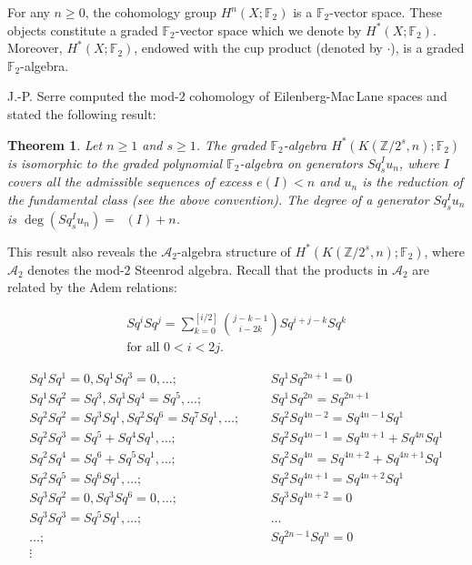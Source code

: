 \documentclass{amsart}
\newtheorem*{thm*}{Theorem}
\theoremstyle{definition}
\theoremstyle{remark}
\DeclareMathOperator{\degst}{deg_{st}}
\newcommand{\Z}{\mathbb{Z}}
\newcommand{\F}{\mathbb{F}}
\newcommand{\A}{\mathcal{A}}
\renewcommand{\geq}{\geqslant}
\begin{document}
For any $n\geq0$, the cohomology group $H^n(X;\F_2)$ is a $\F_2$-vector space. These objects constitute a graded $\F_2$-vector space which we denote by $H^*(X;\F_2)$. Moreover, $H^*(X;\F_2)$, endowed with the cup product (denoted by $\cdot$), is a graded $\F_2$-algebra.

\medskip
\newpage
J.-P. Serre \cite{Se53} computed the mod-$2$ cohomology of Eilenberg-Mac\,Lane spaces and stated the following result:


\begin{thm*}
Let $n\geq1$ and $s\geq1$. The graded $\F_2$-algebra $H^*(K(\Z/2^s,n);\F_2)$ is isomorphic to the graded polynomial $\F_2$-algebra on generators $Sq^I_s u_n$, where $I$ covers all the admissible sequences of excess $e(I)<n$ and $u_n$ is the reduction of the fundamental class (see the above convention). The degree of a generator $Sq^I_s u_n$ is $\deg(Sq^I_s u_n)=\degst(I)+n$. 
\end{thm*}


This result also reveals the $\A_2$-algebra structure of $H^*(K(\Z/2^s,n);\F_2)$, where $\A_2$ denotes the mod-$2$ Steenrod algebra. Recall that the products in $\A_2$ are related by the Adem relations:

\begin{align*}
Sq^iSq^j=\sum_{k=0}^{[i/2]}\binom{j-k-1}{i-2k}Sq^{i+j-k}Sq^k\\
\text{for all $0<i<2j$.}
\end{align*}

\begin{align*}
Sq^1Sq^1=0, Sq^1Sq^3=0,\dots; &&&Sq^1Sq^{2n+1}=0\\
Sq^1Sq^2=Sq^3,Sq^1Sq^4=Sq^5,\dots; &&&Sq^1Sq^{2n}=Sq^{2n+1}\\
Sq^2Sq^2=Sq^3Sq^1, Sq^2Sq^6=Sq^7Sq^1,\dots; &&&Sq^2Sq^{4n-2}=Sq^{4n-1}Sq^1\\
Sq^2Sq^3=Sq^5+Sq^4Sq^1,\dots; &&&Sq^2Sq^{4n-1}=Sq^{4n+1}+Sq^{4n}Sq^1\\
Sq^2Sq^4=Sq^6+Sq^5Sq^1,\dots; &&&Sq^{2}Sq^{4n}=Sq^{4n+2}+Sq^{4n+1}Sq^1\\
Sq^2Sq^5=Sq^6Sq^1,\dots; &&&Sq^2Sq^{4n+1}=Sq^{4n+2}Sq^1\\
Sq^3Sq^2=0, Sq^3Sq^6=0,\dots; &&&Sq^3Sq^{4n+2}=0\\
Sq^3Sq^3=Sq^5Sq^1,\dots; &&&\dots\\
\dots;&&&Sq^{2n-1}Sq^n=0\\
\vdots
\end{align*}
\end{document}
